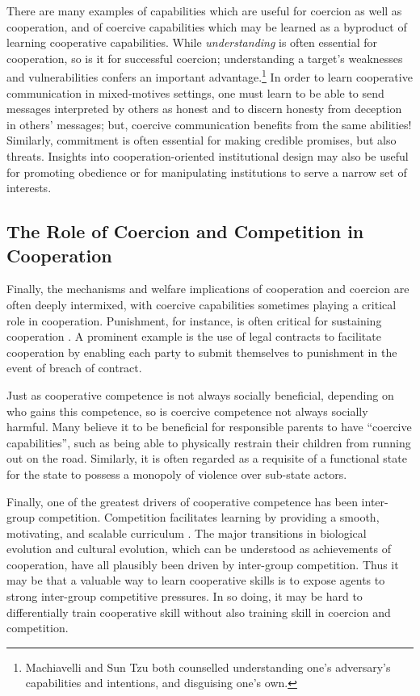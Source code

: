\documentclass[11pt, a4paper, logo, onecolumn, nonumbering]{deepmind}
\begin{document}
There are many examples of capabilities which are useful for coercion as well as cooperation, and of coercive capabilities which may be learned as a byproduct of learning cooperative capabilities. While \textit{understanding} is often essential for cooperation, so is it for successful coercion; understanding a target's weaknesses and vulnerabilities confers an important advantage.\footnote{Machiavelli and Sun Tzu both counselled understanding one's adversary's capabilities and intentions, and disguising one's own.} 
In order to learn cooperative communication in mixed-motives settings, one must learn to be able to send messages interpreted by others as honest and to discern honesty from deception in others' messages; but, coercive communication benefits from the same abilities! Similarly, commitment is often essential for making credible promises, but also threats. Insights into cooperation-oriented institutional design may also be useful for promoting obedience or for manipulating institutions to serve a narrow set of interests. %


\subsection{The Role of Coercion and Competition in Cooperation}

Finally, the mechanisms and welfare implications of cooperation and coercion are often deeply intermixed, with coercive capabilities sometimes playing a critical role in cooperation. Punishment, for instance, is often critical for sustaining cooperation \cite{van2014reward, andreoni2003carrot, boyd2010coordinated, koster2020silly}. %
A prominent example is the use of legal contracts to facilitate cooperation by enabling each party to submit themselves to punishment in the event of breach of contract. 

Just as cooperative competence is not always socially beneficial, depending on who gains this competence, so is coercive competence not always socially harmful. Many believe it to be beneficial for responsible parents to have ``coercive capabilities'', such as being able to physically restrain their children from running out on the road. Similarly, it is often regarded as a requisite of a functional state for the state to possess a monopoly of violence over sub-state actors. %


Finally, one of the greatest drivers of cooperative competence has been inter-group competition. Competition facilitates learning %
by providing a smooth, motivating, and scalable curriculum \cite{Leibo2019AutocurriculaAT}. The major transitions in biological evolution and cultural evolution, which can be understood as achievements of cooperation, have all plausibly been driven by inter-group competition. Thus it may be that a valuable way to learn cooperative skills is to expose agents to strong inter-group competitive pressures.
In so doing, it may be hard to differentially train cooperative skill without also training skill in coercion and competition. %
\end{document}
